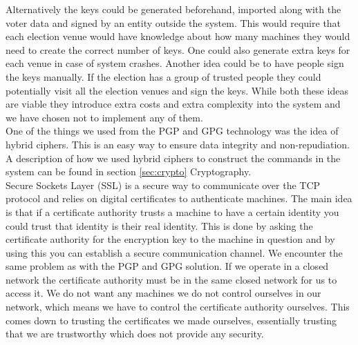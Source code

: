\documentclass[a4paper]{report}
\begin{document}
Alternatively the keys could be generated beforehand, imported along with the voter data and signed by an entity outside the system. This would require that each election venue would have knowledge about how many machines they would need to create the correct number of keys. One could also generate extra keys for each venue in case of system crashes. Another idea could be to have people sign the keys manually. If the election has a group of trusted people they could potentially visit all the election venues and sign the keys. While both these ideas are viable they introduce extra costs and extra complexity into the system and we have chosen not to implement any of them. \\

One of the things we used from the PGP and GPG technology was the idea of hybrid ciphers. This is an easy way to ensure data integrity and non-repudiation. A description of how we used hybrid ciphers to construct the commands in the system can be found in section \ref{sec:crypto} Cryptography. \\

Secure Sockets Layer (SSL) is a secure way to communicate over the TCP protocol and relies on digital certificates to authenticate machines. The main idea is that if a certificate authority trusts a machine to have a certain identity you could trust that identity is their real identity. This is done by asking the certificate authority for the encryption key to the machine in question and by using this you can establish a secure communication channel. We encounter the same problem as with the PGP and GPG solution. If we operate in a closed network the certificate authority must be in the same closed network for us to access it. We do not want any machines we do not control ourselves in our network, which means we have to control the certificate authority ourselves. This comes down to trusting the certificates we made ourselves, essentially trusting that we are trustworthy which does not provide any security.
\end{document}
